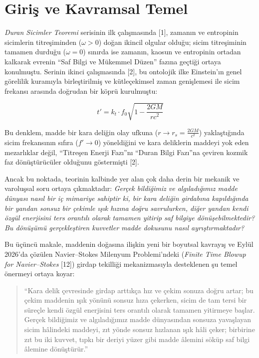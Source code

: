 \documentclass[12pt,a4paper]{article}
\begin{document}
\section{Giriş ve Kavramsal Temel}

\textit{Duran Sicimler Teoremi} serisinin ilk çalışmasında [1], zamanın ve entropinin sicimlerin titreşiminden ($\omega > 0$) doğan ikincil olgular olduğu; sicim titreşiminin tamamen durduğu ($\omega = 0$) sınırda ise zamanın, kaosun ve entropinin ortadan kalkarak evrenin ``Saf Bilgi ve Mükemmel Düzen'' fazına geçtiği ortaya konulmuştu. Serinin ikinci çalışmasında [2], bu ontolojik ilke Einstein'ın genel görelilik kuramıyla birleştirilmiş ve kütleçekimsel zaman genişlemesi ile sicim frekansı arasında doğrudan bir köprü kurulmuştu:

\begin{equation}
t' = k_t \cdot f_0 \sqrt{1 - \frac{2GM}{rc^2}}
\end{equation}

Bu denklem, madde bir kara deliğin olay ufkuna ($r \to r_s = \frac{2GM}{c^2}$) yaklaştığında sicim frekansının sıfıra ($f' \to 0$) yöneldiğini ve kara deliklerin maddeyi yok eden mezarlıklar değil, ``Titreşen Enerji Fazı''nı ``Duran Bilgi Fazı''na çeviren kozmik faz dönüştürücüler olduğunu göstermişti [2].

Ancak bu noktada, teorinin kalbinde yer alan çok daha derin bir mekanik ve varoluşsal soru ortaya çıkmaktadır: \textit{Gerçek bildiğimiz ve algıladığımız madde dünyası nasıl bir iç mimariye sahiptir ki, bir kara deliğin girdabına kapıldığında bir yandan sonsuz bir çekimle ışık hızına doğru savrulurken, diğer yandan kendi özgül enerjisini ters orantılı olarak tamamen yitirip saf bilgiye dönüşebilmektedir? Bu dönüşümü gerçekleştiren kuvvetler madde dokusunu nasıl ayrıştırmaktadır?}

Bu üçüncü makale, maddenin doğasına ilişkin yeni bir boyutsal kavrayış ve Eylül 2026'da çözülen Navier--Stokes Milenyum Problemi'ndeki (\textit{Finite Time Blowup for Navier--Stokes} [12]) girdap tekilliği mekanizmasıyla desteklenen şu temel önermeyi ortaya koyar:

\begin{quote}
``Kara delik çevresinde girdap arttıkça hız ve çekim sonuza doğru artar; bu çekim maddenin ışık yönünü sonsuz hıza çekerken, sicim de tam tersi bir süreçle kendi özgül enerjisini ters orantılı olarak tamamen yitirmeye başlar. Gerçek bildiğimiz ve algıladığımız madde dünyasından sonsuza yavaşlayan sicim hâlindeki maddeyi, zıt yönde sonsuz hızlanan ışık hâli çeker; birbirine zıt bu iki kuvvet, tıpkı bir deriyi yüzer gibi madde âlemini söküp saf bilgi âlemine dönüştürür.''
\end{quote}
\end{document}
